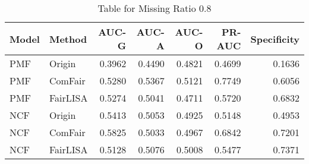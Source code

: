 \begin{table}
\centering
\caption{Table for Missing Ratio 0.8}
\label{tab:missing_0.8}
\begin{tabular}{llrrrrr}
\toprule
Model &   Method &  AUC-G &  AUC-A &  AUC-O &  PR-AUC &  Specificity \\
\midrule
  PMF &   Origin & 0.3962 & 0.4490 & 0.4821 &  0.4699 &       0.1636 \\
  PMF &  ComFair & 0.5280 & 0.5367 & 0.5121 &  0.7749 &       0.6056 \\
  PMF & FairLISA & 0.5274 & 0.5041 & 0.4711 &  0.5720 &       0.6832 \\
  NCF &   Origin & 0.5413 & 0.5053 & 0.4925 &  0.5148 &       0.4953 \\
  NCF &  ComFair & 0.5825 & 0.5033 & 0.4967 &  0.6842 &       0.7201 \\
  NCF & FairLISA & 0.5128 & 0.5076 & 0.5008 &  0.5477 &       0.7371 \\
\bottomrule
\end{tabular}
\end{table}
